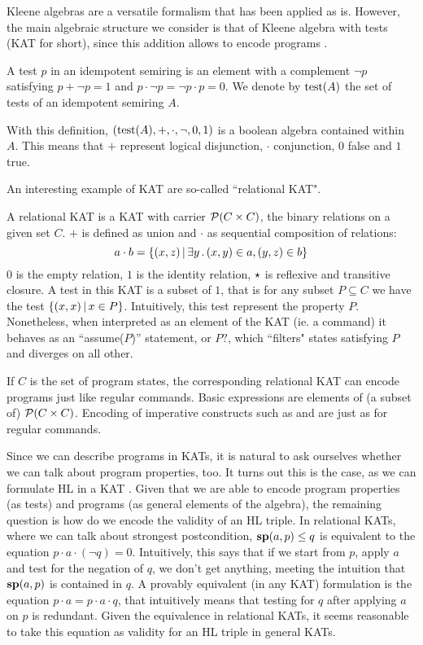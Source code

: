 Kleene algebras are a versatile formalism that has been applied as is. However, the main algebraic structure we consider is that of Kleene algebra with tests (KAT for short), since this addition allows to encode programs \cite{Kozen97}.
\begin{definition}[Test]
	A test $p$ in an idempotent semiring is an element with a complement $\lnot p$ satisfying $p + \lnot p = 1$ and $p \cdot \lnot p = \lnot p \cdot p = 0$. We denote by $\text{test}(A)$ the set of tests of an idempotent semiring $A$.
\end{definition}
With this definition, $(\text{test}(A), +, \cdot, \lnot, 0, 1)$ is a boolean algebra contained within $A$. This means that $+$ represent logical disjunction, $\cdot$ conjunction, $0$ false and $1$ true.

An interesting example of KAT are so-called ``relational KAT".
\begin{example}
	A relational KAT is a KAT with carrier $\mathcal{P}(C \times C)$, the binary relations on a given set $C$. $+$ is defined as union and $\cdot$ as sequential composition of relations:
	\[
	a \cdot b = \{ (x, z) \,\vert\, \exists y \,.\, (x, y) \in a, (y, z) \in b \}
	\]
	$0$ is the empty relation, $1$ is the identity relation, $\star$ is reflexive and transitive closure. A test in this KAT is a subset of $1$, that is for any subset $P \subseteq C$ we have the test $\{ (x, x) \,\vert\, x \in P \}$. Intuitively, this test represent the property $P$. Nonetheless, when interpreted as an element of the KAT (ie. a command) it behaves as an ``assume($P$)'' statement, or $P ?$, which ``filters" states satisfying $P$ and diverges on all other.
\end{example}
If $C$ is the set of program states, the corresponding relational KAT can encode programs just like regular commands. Basic expressions are elements of (a subset of) $\mathcal{P}(C \times C)$. Encoding of imperative constructs such as  and  are just as for regular commands.

Since we can describe programs in KATs, it is natural to ask ourselves whether we can talk about program properties, too. It turns out this is the case, as we can formulate HL in a KAT \cite{Kozen00}. Given that we are able to encode program properties (as tests) and programs (as general elements of the algebra), the remaining question is how do we encode the validity of an HL triple. In relational KATs, where we can talk about strongest postcondition, $\textbf{sp}(a, p) \le q$ is equivalent to the equation $p \cdot a \cdot (\lnot q) = 0$. Intuitively, this says that if we start from $p$, apply $a$ and test for the negation of $q$, we don't get anything, meeting the intuition that $\textbf{sp}(a, p)$ is contained in $q$. A provably equivalent (in any KAT) formulation is the equation $p \cdot a = p \cdot a \cdot q$, that intuitively means that testing for $q$ after applying $a$ on $p$ is redundant. Given the equivalence in relational KATs, it seems reasonable to take this equation as validity for an HL triple in general KATs.

